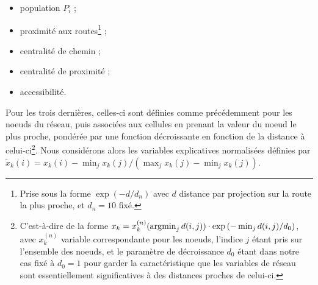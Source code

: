 {\begin{itemize}
	\item population $P_i$ ;
	\item proximité aux routes\footnote{Prise sous la forme $\exp (-d / d_n)$ avec $d$ distance par projection sur la route la plus proche, et $d_n =10$ fixé.} ;
	\item centralité de chemin ;
	\item centralité de proximité ;
	\item accessibilité.
\end{itemize}
Pour les trois dernières, celles-ci sont définies comme précédemment pour les noeuds du réseau, puis associées aux cellules en prenant la valeur du noeud le plus proche, pondérée par une fonction décroissante en fonction de la distance à celui-ci\footnote{C'est-à-dire de la forme $x_k = x^{(n)}_k (\operatorname*{\arg\!\min}_j d(i,j)) \cdot \exp \left( -  \min_j d(i,j) / d_0 \right)$, avec $x^{(n)}_k$ variable correspondante pour les noeuds, l'indice $j$ étant pris sur l'ensemble des noeuds, et le paramètre de décroissance $d_0$ étant dans notre cas fixé à $d_0 = 1$ pour garder la caractéristique que les variables de réseau sont essentiellement significatives à des distances proches de celui-ci.}. Nous considérons alors les variables explicatives normalisées définies par $\tilde{x}_k(i) = x_k(i) - \min_j x_k(j) / (\max_j x_k(j) - \min_j x_k(j))$. 
}






